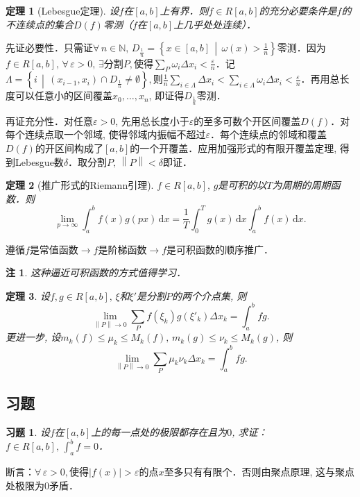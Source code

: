 \documentclass[11pt,a4paper]{ctexart}
\makeatletter
\theoremstyle{thmseries} %
\newtheorem{thm}{定理}[section]
\theoremstyle{exerseries}
\newtheorem{exer}{习题}[section]
\newtheorem*{rem}{注}
\renewenvironment{proof}[1][\proofname]{\par
  \pushQED{\qed}%
  \normalfont \topsep6\p@\@plus6\p@\relax
  \trivlist
  \item[\hskip\labelsep
        \itshape
    #1\@addpunct{}]\ignorespaces
}{%
  \popQED\endtrivlist\@endpefalse
}
\newenvironment{pf}{\begin{proof}[\bfseries\upshape 证\quad]}{\end{proof}}
\newcommand{\cbra}[1]{\mathopen{}\left\{#1\right\}}
\renewcommand{\epsilon}{\varepsilon}
\newcommand{\N}{\mathbb{N}}
\renewcommand{\d}{\mathrm{d}}
\newcommand{\norm}[1]{\left\lVert #1 \right\rVert}
\makeatother
\begin{document}
\begin{thm}[Lebesgue定理]
	设$f$在$[a,b]$上有界．则$f\in R[a,b]$的充分必要条件是$f$的不连续点的集合$D(f)$零测（$f$在$[a,b]$上几乎处处连续）．
\end{thm}
\begin{pf}
	先证必要性．只需证$\forall\,n\in\N,\,D_\frac{1}{n}=\cbra{x\in[a,b]\,\middle\vert\,\omega(x)>\frac{1}{n}}$零测．因为$f\in R[a,b],\,\forall\,\epsilon>0,\,\exists$分割$P,$使得$\sum_P\omega_i\Delta x_i<\frac{\epsilon}{n}$．记$\Lambda=\cbra{i\,\middle\vert\,(x_{i-1},x_i)\cap D_\frac{1}{n}\neq\emptyset},$则$\frac{1}{n}\sum_{i\in\Lambda}\Delta x_i<\sum_{i\in\Lambda}\omega_i\Delta x_i<\frac{\epsilon}{n}$．再用总长度可以任意小的区间覆盖$x_0,\dots,x_n$, 即证得$D_\frac{1}{n}$零测．

	再证充分性．对任意$\epsilon>0$, 先用总长度小于$\epsilon$的至多可数个开区间覆盖$D(f)$．对每个连续点取一个邻域, 使得邻域内振幅不超过$\epsilon$．每个连续点的邻域和覆盖$D(f)$的开区间构成了$[a,b]$的一个开覆盖．应用加强形式的有限开覆盖定理, 得到Lebesgue数$\delta$．取分割$P,\,\norm{P}<\delta$即证．
\end{pf}

\begin{thm}[推广形式的Riemann引理]
	$f\in R[a,b],\,g$是可积的以$T$为周期的周期函数．则
	\[\lim_{p\to\infty}\int_{a}^{b}f(x)g(px)\,\d x=\frac{1}{T}\int_{0}^{T}g(x)\,\d x\int_{a}^{b}f(x)\,\d x.\]
\end{thm}
\begin{pf}
	遵循$f$是常值函数$\to f$是阶梯函数$\to f$是可积函数的顺序推广．
\end{pf}
\begin{rem}
	这种逼近可积函数的方式值得学习．
\end{rem}

\begin{thm}
	设$f,g\in R[a,b],\,\xi$和$\xi'$是分割$P$的两个介点集, 则
	\[\lim_{\norm{P}\to0}\sum_{P}f(\xi_k)g(\xi'_k)\Delta x_k=\int_{a}^{b}fg.\]
	更进一步, 设$m_k(f)\leq\mu_k\leq M_k(f),\,m_k(g)\leq\nu_k\leq M_k(g)$, 则
	\[\lim_{\norm{P}\to0}\sum_{P}\mu_k\nu_k\Delta x_k=\int_{a}^{b}fg.\]
\end{thm}


\subsection{习题}
\begin{exer}
	设$f$在$[a,b]$上的每一点处的极限都存在且为$0$, 求证：$f\in R[a,b],\,\int_{a}^{b}f=0$．
\end{exer}
\begin{pf}
	断言：$\forall\,\epsilon>0,$使得$|f(x)|>\epsilon$的点$x$至多只有有限个．否则由聚点原理, 这与聚点处极限为0矛盾．
\end{pf}
\end{document}
